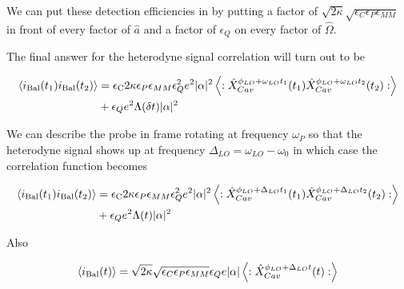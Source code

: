 \documentclass[12pt]{article}
\begin{document}
We can put these detection efficiencies in by putting a factor of $\sqrt{2\kappa}\sqrt{\epsilon_C \epsilon_{P} \epsilon_{MM}}$ in front of every factor of $\hat{a}$ and a factor of $\epsilon_Q$ on every factor of $\hat{\Omega}$.

The final answer for the heterodyne signal correlation will turn out to be 

\begin{align}
\braket{i_{\text{Bal}}(t_1)i_{\text{Bal}}(t_2)} &= \epsilon_{\text{C}} 2\kappa  \epsilon_{P} \epsilon_{MM} \epsilon_Q^2 e^2 |\alpha|^2 \left<:\hat{X}_{Cav}^{\phi_{LO}+\omega_{LO}t_1}(t_1) \hat{X}_{Cav}^{\phi_{LO}+\omega_{LO} t_2}(t_2) :\right>\\
&+\epsilon_Q e^2\Lambda(\delta t) |\alpha|^2
\end{align}

We can describe the probe in frame rotating at frequency $\omega_P$ so that the heterodyne signal shows up at frequency $\Delta_{LO} = \omega_{LO}-\omega_0$ in which case the correlation function becomes

\begin{align}
\braket{i_{\text{Bal}}(t_1)i_{\text{Bal}}(t_2)} &= \epsilon_{\text{C}} 2\kappa  \epsilon_{P} \epsilon_{MM} \epsilon_Q^2 e^2 |\alpha|^2 \left<:\hat{X}_{Cav}^{\phi_{LO}+\Delta_{LO}t_1}(t_1) \hat{X}_{Cav}^{\phi_{LO}+\Delta_{LO}t_2}(t_2) :\right>\\
&+\epsilon_Q e^2\Lambda(t) |\alpha|^2
\end{align}

Also

\begin{align}
\braket{i_{\text{Bal}}(t)} = \sqrt{2\kappa} \sqrt{\epsilon_C \epsilon_P \epsilon_{MM}} \epsilon_Q e |\alpha| \left<:\hat{X}_{Cav}^{\phi_{LO}+\Delta_{LO}t}(t):\right>
\end{align}
\end{document}
